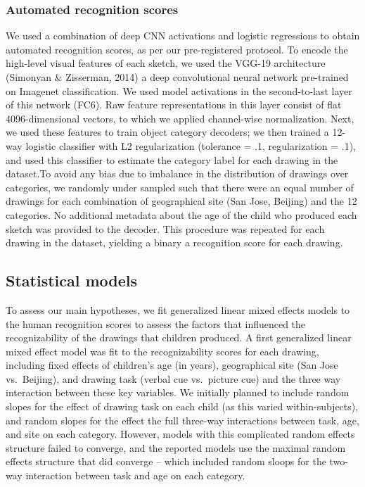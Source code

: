 \documentclass[
  english,
  man]{apa6}
\begin{document}
\hypertarget{automated-recognition-scores}{%
\subsubsection{Automated recognition scores}\label{automated-recognition-scores}}

We used a combination of deep CNN activations and logistic regressions to obtain automated recognition scores, as per our pre-registered protocol. To encode the high-level visual features of each sketch, we used the VGG-19 architecture (Simonyan \& Zisserman, 2014) a deep convolutional neural network pre-trained on Imagenet classification. We used model activations in the second-to-last layer of this network (FC6). Raw feature representations in this layer consist of flat 4096-dimensional vectors, to which we applied channel-wise normalization. Next, we used these features to train object category decoders; we then trained a 12-way logistic classifier with L2 regularization (tolerance = .1, regularization = .1), and used this classifier to estimate the category label for each drawing in the dataset.To avoid any bias due to imbalance in the distribution of drawings over categories, we randomly under sampled such that there were an equal number of drawings for each combination of geographical site (San Jose, Beijing) and the 12 categories. No additional metadata about the age of the child who produced each sketch was provided to the decoder. This procedure was repeated for each drawing in the dataset, yielding a binary a recognition score for each drawing.

\hypertarget{statistical-models}{%
\subsection{Statistical models}\label{statistical-models}}

To assess our main hypotheses, we fit generalized linear mixed effects models to the human recognition scores to assess the factors that influenced the recognizability of the drawings that children produced. A first generalized linear mixed effect model was fit to the recognizability scores for each drawing, including fixed effects of children's age (in years), geographical site (San Jose vs.~Beijing), and drawing task (verbal cue vs.~picture cue) and the three way interaction between these key variables. We initially planned to include random slopes for the effect of drawing task on each child (as this varied within-subjects), and random slopes for the effect the full three-way interactions between task, age, and site on each category. However, models with this complicated random effects structure failed to converge, and the reported models use the maximal random effects structure that did converge -- which included random sloops for the two-way interaction between task and age on each category.
\end{document}
